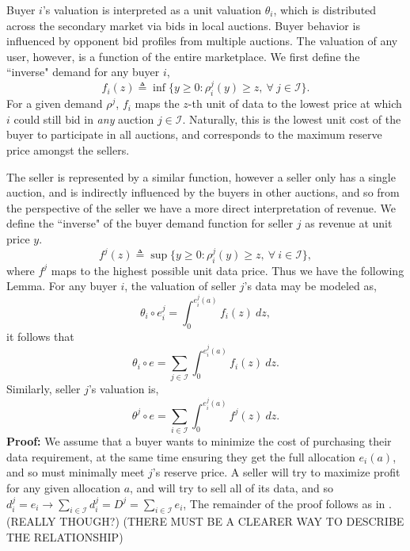 \documentclass[12pt]{article}
\theoremstyle{definition}
\newcommand{\mcI}{\mathcal{I}}
\begin{document}
\begin{multicols}{2}
Buyer $i$'s valuation is interpreted as a unit valuation $\theta_i$,
which is distributed across the secondary market via bids in local auctions. 
Buyer behavior is influenced by opponent bid profiles from multiple auctions.
The valuation of any user, however, is a function of the entire marketplace.  
We first define the ``inverse" demand for any buyer $i$,
\begin{equation}\label{buyerinversedemand}
    f_i(z) \triangleq \inf\big\lbrace y\ge 0:
        \rho_i^j(y) \ge z, \ \forall \ j \in \mcI\big\rbrace.
\end{equation}
For a given demand $\rho^j$, $f_i$ maps the $z$-th unit of data to the lowest price at
which $i$ could still bid in \emph{any} auction $j\in\mcI$.
Naturally, this is the
lowest unit cost of the buyer to participate in all auctions, and corresponds to
the maximum reserve price amongst the sellers. 

The seller is represented by a similar function, however a seller only has a
single auction, and is indirectly influenced by the buyers in other auctions, and so from the perspective of the
seller we have a more direct interpretation of revenue.
We define the ``inverse" of the buyer demand function for seller $j$ as revenue at unit price $y$. 
\begin{equation}\label{sellerinversedemand}
    f^j(z) \triangleq \sup\big\lbrace y\ge 0:
        \rho_i^j(y) \ge z, \ \forall \ i \in \mcI\big\rbrace,
\end{equation}
where $f^j$ maps to the highest possible unit data price.
Thus we have the following Lemma. 
{
For any buyer $i$, the valuation of seller $j$'s data may be modeled as,
\begin{equation}\label{singlevaluation}
    \theta_i \circ e_i^j = \int_0^{e_i^j(a)} f_i(z) \ dz,
\end{equation}
it follows that 
\begin{equation}\label{buyervaluation}
    \theta_i \circ e = \displaystyle\sum_{j\in\mcI}
 \int_0^{e_i^j(a)} f_i(z) \ dz.
\end{equation}
Similarly, seller $j$'s valuation is,
\begin{equation}\label{sellervaluation}
    \theta^j \circ e = \displaystyle\sum_{i\in\mcI}
 \int_0^{e_i^j(a)} f^j(z) \ dz.
\end{equation}
}
\textbf{Proof:} 
We assume that a buyer wants to minimize the cost of purchasing their data
requirement, at the same time ensuring they get the full allocation $e_i(a)$,
and so must minimally meet $j$'s reserve price.
A seller will try to maximize profit for any given allocation $a$,
and will try to sell all of its data, and so 
$d_i^j = e_i \rightarrow \sum_{i\in{\mcI}} d_i^j = D^j =
\sum_{i\in\mcI} e_i$,
The remainder of the proof follows as in \cite{semret}. (REALLY THOUGH?)
(THERE MUST BE A CLEARER WAY TO DESCRIBE THE RELATIONSHIP)


\end{multicols}
\end{document}
